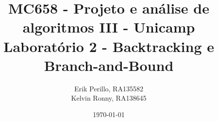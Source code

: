 \documentclass[7pt]{article}
\begin{document}

\author{Erik Perillo, RA135582\\
        Kelvin Ronny, RA138645}
\date{\today}
\title{\vspace{-2cm}%
	{\small MC658 - Projeto e análise de algoritmos III - Unicamp}\\
    {\Large Laboratório 2 - Backtracking e Branch-and-Bound}}
\maketitle\vspace{-0.5cm}
\posttitle{\par\end{center}}

\makeatletter
\def\BState{\State\hskip-\ALG@thistlm}
\makeatother
\end{document}
